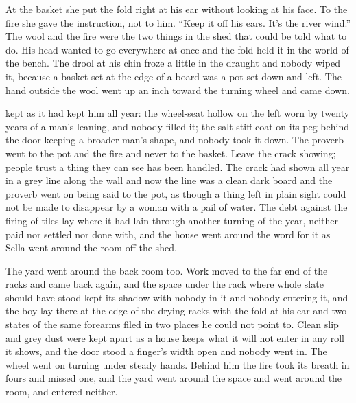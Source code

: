 At the basket she put the fold right at his ear without looking at his face. To the fire she gave the instruction, not to him. “Keep it off his ears. It's the river wind.” The wool and the fire were the two things in the shed that could be told what to do. His head wanted to go everywhere at once and the fold held it in the world of the bench. The drool at his chin froze a little in the draught and nobody wiped it, because a basket set at the edge of a board was a pot set down and left. The hand outside the wool went up an inch toward the turning wheel and came down.

 kept  as it had kept him all year: the wheel-seat hollow on the left worn by twenty years of a man's leaning, and nobody filled it; the salt-stiff coat on its peg behind the door keeping a broader man's shape, and nobody took it down. The proverb went to the pot and the fire and never to the basket. Leave the crack showing; people trust a thing they can see has been handled. The crack had shown all year in a grey line along the wall and now the line was a clean dark board and the proverb went on being said to the pot, as though a thing left in plain sight could not be made to disappear by a woman with a pail of water. The debt against the firing of tiles lay where it had lain through another turning of the year, neither paid nor settled nor done with, and the house went around the word for it as Sella went around the room off the shed.

The yard went around the back room too. Work moved to the far end of the racks and came back again, and the space under the rack where whole slate should have stood kept its shadow with nobody in it and nobody entering it, and the boy lay there at the edge of the drying racks with the fold at his ear and two states of the same forearms filed in two places he could not point to. Clean slip and grey dust were kept apart as a house keeps what it will not enter in any roll it shows, and the door stood a finger's width open and nobody went in. The wheel went on turning under steady hands. Behind him the fire took its breath in fours and missed one, and the yard went around the space and went around the room, and entered neither.

